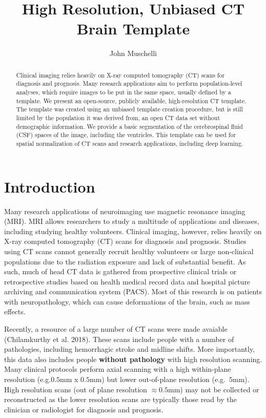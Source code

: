 \documentclass[]{elsarticle} %
\begin{document}
\begin{frontmatter}

  \title{High Resolution, Unbiased CT Brain Template}
    \author[JHSPH]{John Muschelli}
      \address[JHSPH]{Johns Hopkins Bloomberg School of Public Health, Department of Biostatistics, 615 N Wolfe St, Baltimore, MD, 21205}
    
  \begin{abstract}
  Clinical imaging relies heavily on X-ray computed tomography (CT) scans for diagnosis and prognosis. Many research applications aim to perform population-level analyses, which require images to be put in the same space, usually defined by a template. We present an open-source, publicly available, high-resolution CT template. The template was created using an unbiased template creation procedure, but is still limited by the population it was derived from, an open CT data set without demographic information. We provide a basic segmentation of the cerebrospinal fluid (CSF) spaces of the image, including the ventricles. This template can be used for spatial normalization of CT scans and research applications, including deep learning.
  \end{abstract}
  
 \end{frontmatter}

\hypertarget{introduction}{%
\section{Introduction}\label{introduction}}

Many research applications of neuroimaging use magnetic resonance imaging (MRI). MRI allows researchers to study a multitude of applications and diseases, including studying healthy volunteers. Clinical imaging, however, relies heavily on X-ray computed tomography (CT) scans for diagnosis and prognosis. Studies using CT scans cannot generally recruit healthy volunteers or large non-clinical populations due to the radiation exposure and lack of substantial benefit. As such, much of head CT data is gathered from prospective clinical trials or retrospective studies based on health medical record data and hospital picture archiving and communication system (PACS). Most of this research is on patients with neuropathology, which can cause deformations of the brain, such as mass effects.

Recently, a resource of a large number of CT scans were made avaiable (Chilamkurthy et al. 2018). These scans include people with a number of pathologies, including hemorrhagic stroke and midline shifts. More importantly, this data also includes people \textbf{without pathology} with high resolution scanning. Many clinical protocols perform axial scanning with a high within-plane resolution (e.g.\(0.5\)mm x \(0.5\)mm) but lower out-of-plane resolution (e.g.~\(5\)mm). High resolution scans (out of plane resolution \(\approx 0.5\)mm) may not be collected or reconstructed as the lower resolution scans are typically those read by the clinician or radiologist for diagnosis and prognosis.
\end{document}
